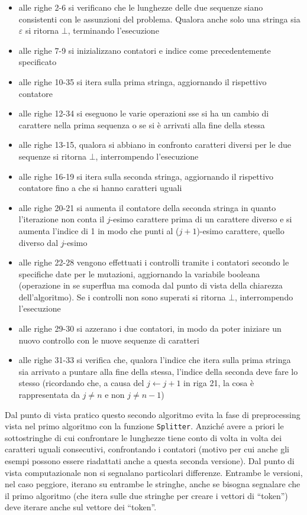 \documentclass[a4paper,12pt, oneside]{book}
\begin{document}
\begin{itemize}
  \item alle righe 2-6 si verificano che le lunghezze delle due sequenze siano
  consistenti con le assunzioni del problema. Qualora anche solo una stringa sia
  $\varepsilon$ si ritorna $\bot$, terminando l'esecuzione
  \item alle righe 7-9 si inizializzano contatori e indice come precedentemente
  specificato 
  \item alle righe 10-35 si itera sulla prima stringa, aggiornando il
  rispettivo contatore
  \item alle righe 12-34 si eseguono le varie operazioni sse si
  ha un cambio di carattere nella prima sequenza o se si è arrivati alla fine
  della stessa
  \item alle righe 13-15, qualora si abbiano in confronto caratteri diversi per
  le due sequenze si ritorna $\bot$, interrompendo l'esecuzione
  \item alle righe 16-19 si itera sulla seconda stringa, aggiornando il
  rispettivo contatore fino a che si hanno caratteri uguali
  \item alle righe 20-21 si aumenta il contatore della seconda stringa in quanto
  l'iterazione non conta il $j$-esimo carattere prima di un carattere diverso e
  si aumenta l'indice di 1 in modo che punti al ($j+1$)-esimo carattere, quello
  diverso dal $j$-esimo 
  \item alle righe 22-28 vengono effettuati i controlli tramite i contatori
  secondo le specifiche date per le mutazioni, aggiornando la variabile
  booleana (operazione in se superflua ma comoda dal punto di vista della
  chiarezza dell'algoritmo). Se i controlli non sono superati si ritorna $\bot$,
  interrompendo l'esecuzione
  \item alle righe 29-30 si azzerano i due contatori, in modo da poter iniziare
  un nuovo controllo con le nuove sequenze di caratteri
  \item alle righe 31-33 si verifica che, qualora l'indice che itera sulla prima
  stringa sia arrivato a puntare alla fine della stessa, l'indice della seconda
  deve fare lo stesso (ricordando che, a causa del $j\gets j+1$ in riga 21, la
  cosa è rappresentata da $j\neq n$ e non $j\neq n-1$)
\end{itemize}
Dal punto di vista pratico questo secondo algoritmo evita la fase di
preprocessing vista nel primo algoritmo con la funzione
\texttt{Splitter}. Anziché avere a priori le sottostringhe di cui confrontare le
lunghezze tiene conto di volta in volta dei caratteri uguali consecutivi,
confrontando i contatori (motivo per cui anche gli esempi possono essere
riadattati anche a questa seconda versione). Dal
punto di vista computazionale non si segnalano particolari differenze. Entrambe
le versioni, nel caso peggiore, iterano su entrambe le stringhe, anche se
bisogna segnalare che il primo algoritmo (che itera sulle due stringhe per
creare i vettori di ``token'') deve iterare anche sul vettore dei ``token''. 
\end{document}
